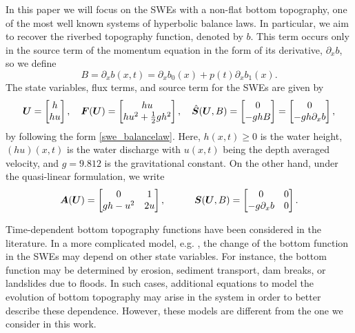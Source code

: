 In this paper we will focus on the SWEs with a non-flat bottom topography, one of the most well known systems of hyperbolic balance laws. In particular, we aim to recover the riverbed topography function, denoted by $b$. This term occurs only in the source term of the momentum equation in the form of its derivative, $\partial_x b$, so we define
\begin{equation}\label{B_SWE}
    B=\partial_x b(x,t) = \partial_x b_0(x) + p(t)\partial_x b_1(x).
\end{equation} 
The state variables, flux terms, and source term for the SWEs are given by
\begin{equation}\label{eq:SWE}
    \bm{U}=\begin{bmatrix}h \\ hu\end{bmatrix},
    \quad
    \bm{F}(\bm{U}) = \begin{bmatrix}hu \\ hu^2+\frac{1}{2}gh^2\end{bmatrix},
    \quad
    \hat{\bm{S}}(\bm{U},B) = \begin{bmatrix}0 \\ -ghB\end{bmatrix}
    =\begin{bmatrix}0 \\ -gh\partial_x b\end{bmatrix},
\end{equation}
by following the form \eqref{swe_balancelaw}. Here, $h(x,t) \geq 0$ is the water height, $(hu)(x,t)$ is the water discharge with $u(x,t)$ being the depth averaged velocity, and $g = 9.812$ is the gravitational constant. On the other hand, under the quasi-linear formulation, we write
\begin{equation}
    \bm{A}(\bm{U}) = \begin{bmatrix}0 & 1 \\ gh-u^2 & 2u\end{bmatrix},
    \quad\quad\quad
    \bm{S}(\bm{U},B) = \begin{bmatrix}0 & 0\\ -g\partial_x b & 0\end{bmatrix}.
    \label{forward_prob}
\end{equation}

Time-dependent bottom topography functions have been considered in the literature. In a more complicated model, e.g. \cite{Sleath1995SedimentCurrents, Heinrich1992NonlinearLandslides, Hu2012NumericalChina, Li2011FullyRivers, Kurganov2018Finite-volumeEquations}, the change of the bottom function in the SWEs may depend on other state variables. For instance, the bottom function may be determined by erosion, sediment transport, dam breaks, or landslides due to floods. In such cases, additional equations to model the evolution of bottom topography may arise in the system in order to better describe these dependence. However, these models are different from the one we consider in this work.

